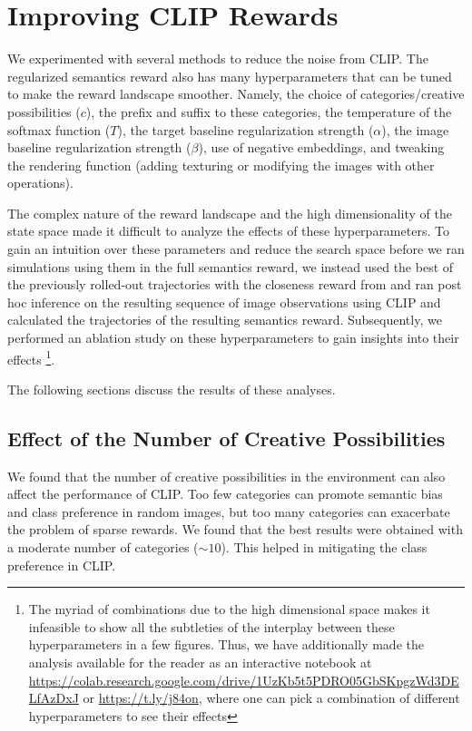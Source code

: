 

\section{Improving CLIP Rewards}
\label{sec:improving-rewards}

We experimented with several methods to reduce the noise from CLIP.
The regularized semantics reward also has many hyperparameters that can be tuned to make the reward landscape smoother.
Namely, the choice of categories/creative possibilities (\(c\)), the prefix and suffix to these categories, the temperature of the softmax function (\(T\)), the target baseline regularization strength (\(\alpha\)), the image baseline regularization strength (\(\beta\)), use of negative embeddings, and tweaking the rendering function (adding texturing or modifying the images with other operations).

The complex nature of the reward landscape and the high dimensionality of the state space made it difficult to analyze the effects of these hyperparameters.
To gain an intuition over these parameters and reduce the search space before we ran simulations using them in the full semantics reward, we instead used the best of the previously rolled-out trajectories with the closeness reward from  and ran post hoc inference on the resulting sequence of image observations using CLIP and calculated the trajectories of the resulting semantics reward.
Subsequently, we performed an ablation study on these hyperparameters to gain insights into their effects \footnote{The myriad of combinations due to the high dimensional space makes it infeasible to show all the subtleties of the interplay between these hyperparameters in a few figures.
Thus, we have additionally made the analysis available for the reader as an interactive notebook at \url{https://colab.research.google.com/drive/1UzKb5t5PDRO05GbSKpgzWd3DELfAzDxJ} or \url{https://t.ly/j84on}, where one can pick a combination of different hyperparameters to see their effects}.

The following sections discuss the results of these analyses.

\subsection{Effect of the Number of Creative Possibilities}
\label{sec:clip-categories}
We found that the number of creative possibilities in the environment can also affect the performance of CLIP.
Too few categories can promote semantic bias and class preference in random images, but too many categories can exacerbate the problem of sparse rewards.
We found that the best results were obtained with a moderate number of categories (\(\sim 10\)).
This helped in mitigating the class preference in CLIP.

